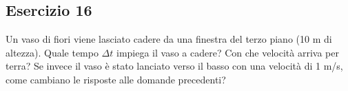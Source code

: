 \documentclass[12pt,a4paper]{book}
\begin{document}

\subsection*{Esercizio 16}
Un vaso di fiori viene lasciato cadere da una finestra del terzo piano (10 m di altezza). Quale tempo $\Delta t$ impiega il vaso a cadere? Con che velocità arriva per terra? Se invece il vaso è stato lanciato verso il basso con una velocità di 1 m/s, come cambiano le risposte alle domande precedenti?
\end{document}
